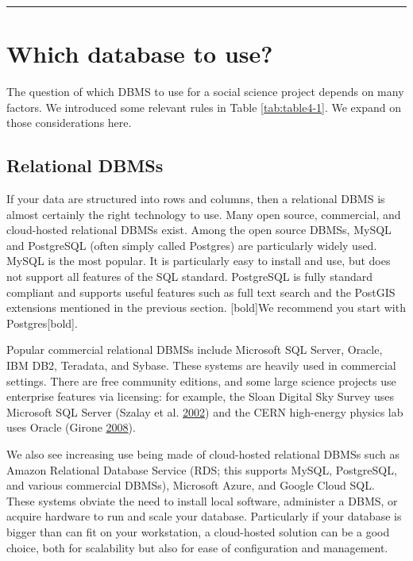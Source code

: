 \documentclass[]{krantz}
\begin{document}
\begin{center}\rule{0.5\linewidth}{\linethickness}\end{center}

\section{Which database to use?}\label{which-database-to-use}

The question of which DBMS to use for a social science project depends
on many factors. We introduced some relevant rules in Table
\ref{tab:table4-1}. We expand on those considerations here.

\subsection{Relational DBMSs}\label{relational-dbmss-1}

If your data are structured into rows and columns, then a relational
DBMS is almost certainly the right technology to use. Many open source,
commercial, and cloud-hosted relational DBMSs exist. Among the open
source DBMSs, MySQL and PostgreSQL (often simply called Postgres) are
particularly widely used. MySQL is the most popular. It is particularly
easy to install and use, but does not support all features of the SQL
standard. PostgreSQL is fully standard compliant and supports useful
features such as full text search and the PostGIS extensions mentioned
in the previous section. {[}bold{]}We recommend you start with
Postgres{[}bold{]}.

Popular commercial relational DBMSs include Microsoft SQL Server,
Oracle, IBM DB2, Teradata, and Sybase. These systems are heavily used in
commercial settings. There are free community editions, and some large
science projects use enterprise features via licensing: for example, the
Sloan Digital Sky Survey uses Microsoft SQL Server (Szalay et al.
\protect\hyperlink{ref-szalay2002sdss}{2002}) and the CERN high-energy
physics lab uses Oracle (Girone
\protect\hyperlink{ref-girone2008cern}{2008}).

We also see increasing use being made of cloud-hosted relational DBMSs
such as Amazon Relational Database Service (RDS; this supports MySQL,
PostgreSQL, and various commercial DBMSs), Microsoft Azure, and Google
Cloud SQL. These systems obviate the need to install local software,
administer a DBMS, or acquire hardware to run and scale your database.
Particularly if your database is bigger than can fit on your
workstation, a cloud-hosted solution can be a good choice, both for
scalability but also for ease of configuration and management.
\end{document}
